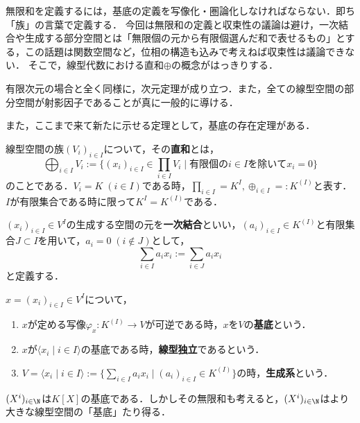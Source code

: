 \documentclass[uplatex, dvipdfmx]{jsreport}
\begin{document}
\begin{tcolorbox}[colframe=ForestGreen, colback=ForestGreen!10!white, breakable]
    無限和を定義するには，基底の定義を写像化・圏論化しなければならない．即ち「族」の言葉で定義する．
    今回は無限和の定義と収束性の議論は避け，一次結合や生成する部分空間とは「無限個の元から有限個選んだ和で表せるもの」とする，この話題は関数空間など，位相の構造も込みで考えねば収束性は議論できない．
    そこで，線型代数における直和$\oplus$の概念がはっきりする．

    有限次元の場合と全く同様に，次元定理が成り立つ．また，全ての線型空間の部分空間が射影因子であることが真に一般的に導ける．

    また，ここまで来て新たに示せる定理として，基底の存在定理がある．
\end{tcolorbox}

\begin{definition}[任意個の線型空間の直和]
    線型空間の族$(V_i)_{i\in I}$について，その\textbf{直和}とは，
    \[ \bigoplus_{i\in I}V_i:=\{(x_i)_{i\in I}\in\prod_{i\in I}V_i\mid 有限個のi\in Iを除いてx_i=0\} \]
    のことである．$V_i=K\;(i\in I)$である時，$\prod_{i\in I}=K^I, \oplus_{i\in I}=:K^{(I)}$と表す．$I$が有限集合である時に限って$K^I=K^{(I)}$である．
\end{definition}

\begin{definition}[任意個の一次結合]
    $(x_i)_{i\in I}\in V^I$の生成する空間の元を\textbf{一次結合}といい，$(a_i)_{i\in I}\in K^{(I)}$と有限集合$J\subset I$を用いて，$a_i=0\;(i\notin J)$として，
    \[ \sum_{i\in I}a_ix_i:=\sum_{i\in J}a_ix_i \]
    と定義する．
\end{definition}

\begin{definition}
    $x=(x_i)_{i\in I}\in V^I$について，
    \begin{enumerate}
        \item $x$が定める写像$\varphi_x:K^{(I)}\to V$が可逆である時，$x$を$V$の\textbf{基底}という．
        \item $x$が$\langle x_i\mid i\in I\rangle$の基底である時，\textbf{線型独立}であるという．
        \item $V=\langle x_i\mid i\in I\rangle:=\{\sum_{i\in I}a_ix_i\mid (a_i)_{i\in I}\in K^{(I)}\}$の時，\textbf{生成系}という．
    \end{enumerate}
\end{definition}

\begin{example}
    $(X^i)_{i\in\N}$は$K[X]$の基底である．しかしその無限和も考えると，$(X^i)_{i\in\N}$はより大きな線型空間の「基底」たり得る．
\end{example}
\end{document}
